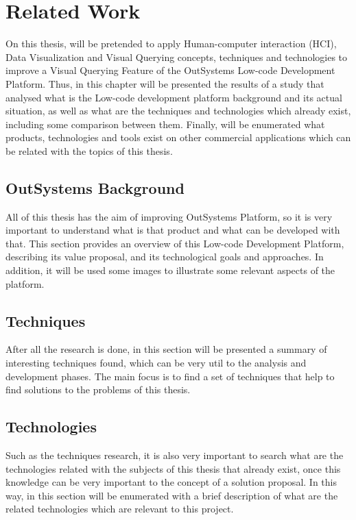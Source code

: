 \chapter{Related Work}
\label{cha:related_work}
On this thesis, will be pretended to apply Human-computer interaction (HCI), Data 
Visualization and Visual Querying concepts, techniques and technologies to improve 
a Visual Querying Feature of the OutSystems Low-code Development Platform. Thus, 
in this chapter will be presented the results of a study that analysed what is 
the Low-code development platform background and its actual situation, as well as 
what are the techniques and technologies which already exist, including some 
comparison between them. Finally, will be enumerated what products, technologies 
and tools exist on other commercial applications which can be related with the 
topics of this thesis.

\section{OutSystems Background}
\label{sec:outsystems_background}
All of this thesis has the aim of improving OutSystems Platform, so it is 
very important to understand what is that product and what can be developed with 
that.
This section provides an overview of this Low-code Development Platform, 
describing its value proposal, and its technological goals and approaches. In 
addition, it will be used some images to illustrate some relevant aspects of the 
platform.

\section{Techniques}
\label{sec:techniques}
After all the research is done, in this section will be presented a summary of 
interesting techniques found, which can be very util to the analysis and 
development phases. The main focus is to find a set of techniques that help 
to find solutions to the problems of this thesis.

\section{Technologies}
\label{sec:technologies}
Such as the techniques research, it is also very important to search what are 
the technologies related with the subjects of this thesis that already exist, 
once this knowledge can be very important to the concept of a solution proposal.
In this way, in this section will be enumerated with a brief description of what 
are the related technologies which are relevant to this project. 

